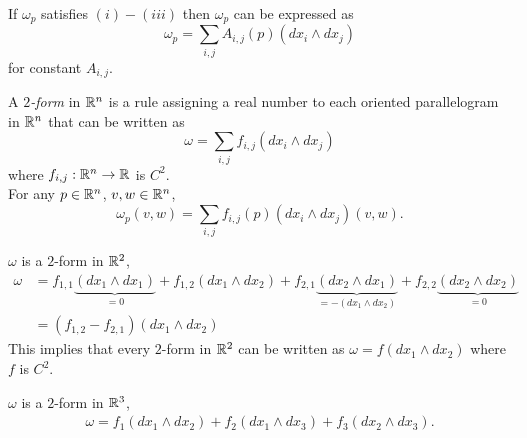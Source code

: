 \documentclass[11pt]{article}
\begin{document}
\begin{remark} If $\omega_p$ satisfies $(i) - (iii)$ then $\omega_p$ can be expressed as $$\omega_p = \sum_{i, j} A_{i, j}(p) (dx_i \wedge dx_j)$$ for constant $A_{i, j}$.
\end{remark}

\begin{definition} A \emph{$2$-form} in $\mathbb{R}^n$ is a rule assigning a real number to each oriented parallelogram in $\mathbb{R}^n$ that can be written as $$\omega = \sum_{i, j} f_{i, j} (dx_i \wedge dx_j)$$ where $f_{i, j}: \mathbb{R}^n \to \mathbb{R}$ is $C^2$. \\

For any $p \in \mathbb{R}^n$, $v, w \in \mathbb{R}^n$, $$\omega_p(v, w) = \sum_{i, j} f_{i, j}(p) (dx_i \wedge dx_j)(v, w).$$
\end{definition}

\begin{example} $\omega$ is a $2$-form in $\mathbb{R}^2$, \begin{align*} \omega & = f_{1,1} \underbrace{(dx_1 \wedge dx_1)}_{= 0} + f_{1, 2} (dx_1 \wedge dx_2) + f_{2, 1} \underbrace{(dx_2 \wedge dx_1)}_{= - (dx_1 \wedge dx_2)} + f_{2, 2} \underbrace{(dx_2 \wedge dx_2)}_{= 0} \\ & = (f_{1, 2} - f_{2, 1})(dx_1 \wedge dx_2) \end{align*}
  This implies that every $2$-form in $\mathbb{R}^2$ can be written as $\omega = f(dx_1 \wedge dx_2)$ where $f$ is $C^2$.
\end{example}

\begin{example} $\omega$ is a $2$-form in $\mathbb{R}^3$, \begin{align*} \omega = f_1 (dx_1 \wedge dx_2) + f_2 (dx_1 \wedge dx_3) + f_3 (dx_2 \wedge dx_3). \end{align*}
\end{example}
\end{document}
